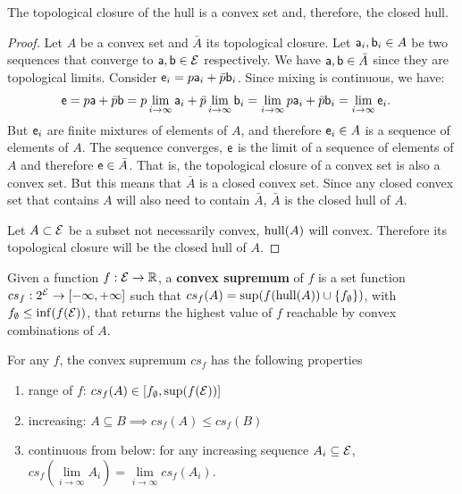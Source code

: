 \begin{mathSection}
\begin{prop}
	The topological closure of the hull is a convex set and, therefore, the closed hull.
\end{prop}

\begin{proof}
	Let $A$ be a convex set and $\bar{A}$ its topological closure. Let $\ens[a]_i, \ens[b]_i \in A$ be two sequences that converge to $\ens[a], \ens[b] \in \Ens$ respectively. We have $\ens[a], \ens[b] \in \bar{A}$ since they are topological limits. Consider $\ens_i = p \ens[a]_i + \bar{p} \ens[b]_i$. Since mixing is continuous, we have:
	\begin{equation}
		\begin{aligned}
			\ens &= p \ens[a] + \bar{p} \ens[b] = p \lim\limits_{i \to \infty} \ens[a]_i + \bar{p} \lim\limits_{i \to \infty} \ens[b]_i = \lim\limits_{i \to \infty} p \ens[a]_i + \bar{p} \ens[b]_i = \lim\limits_{i \to \infty} \ens_i.
		\end{aligned}
	\end{equation}
	But $\ens_i$ are finite mixtures of elements of $A$, and therefore $\ens_i \in A$ is a sequence of elements of $A$. The sequence converges, $\ens$ is the limit of a sequence of elements of $A$ and therefore $\ens \in \bar{A}$. That is, the topological closure of a convex set is also a convex set. But this means that $\bar{A}$ is a closed convex set. Since any closed convex set that contains $A$ will also need to contain $\bar{A}$, $\bar{A}$ is the closed hull of $A$.

	Let $A \subset \Ens$ be a subset not necessarily convex, $\hull(A)$ will convex. Therefore its topological closure will be the closed hull of $A$.
\end{proof}

\begin{defn}
	Given a function $f : \Ens \to \mathbb{R}$, a \textbf{convex supremum} of $f$ is a set function $cs_f : 2^{\Ens} \to [- \infty, + \infty]$ such that $cs_f(A) = \sup(f(\hull(A)) \cup \{f_{\emptyset}\})$, with $f_{\emptyset} \leq \inf(f(\Ens))$, that returns the highest value of $f$ reachable by convex combinations of $A$.
\end{defn}

\begin{prop}\label{pm_es_convexSupremumProps}
	For any $f$, the convex supremum $cs_f$ has the following properties
	\begin{enumerate}
		\item range of $f$: $cs_f(A) \in [f_{\emptyset}, \sup(f(\Ens))]$
		\item increasing: $A \subseteq B \implies cs_f(A) \leq cs_f(B)$
		\item continuous from below: for any increasing sequence $A_i \subseteq \Ens$, $cs_f(\lim\limits_{i \to \infty} A_i) = \lim\limits_{i \to \infty} cs_f(A_i)$.
	\end{enumerate}
\end{prop}


\end{mathSection}
